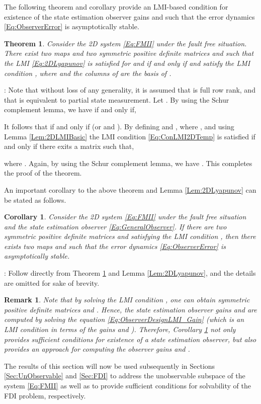 \documentclass[journal,12pt,draftcls,onecolumn]{IEEEtran}
\newcommand{\bs}{\begin{small}}
\newcommand{\es}{\end{small}}
\def\QEDclosed{\hfill\IEEEQEDclosed}
\renewcommand{\qed}{\QEDclosed}
\renewenvironment{proof}[1][\proofname]{\noindent\nobreakspace{\bfseries #1}:\;}{\qed\par}
\newtheorem{theorem}{Theorem}
\newtheorem{corollary}{Corollary}
\newtheorem{remark}{Remark}
\begin{document}
The following theorem and corollary provide an LMI-based condition for existence of the state estimation observer gains  and  such that the error dynamics \eqref{Eq:ObserverError} is asymptotically stable.
\begin{theorem}\label{Thm:ObserverGain2LMIs}
	Consider the 2D system \eqref{Eq:FMII} under the fault free situation.  There exist two maps  and  two symmetric positive definite matrices  and  such that the LMI \eqref{Eq:2DLyapunov} is satisfied for  and  if and only if  and  satisfy the LMI condition , where  and the columns of  are the basis of .
\end{theorem}
\begin{proof}
	Note that  without loss of any generality, it is assumed that  is full row rank, and  that is equivalent to partial state measurement. Let . By using the Schur complement lemma, we have  if and only if,
	
	It follows that
	 if and only if  (or  and ). By defining  and , where , and using Lemma \ref{Lem:2DLMIBasic} the LMI condition \eqref{Eq:ConLMI2DTemp} is satisfied if and only if there exits a matrix  such that,
	\bs
	
	\es
	where . Again, by using the Schur complement lemma, we have
	. This completes the proof of the theorem.
\end{proof}
An important corollary to the above theorem and Lemma \ref{Lem:2DLyapunov} can be stated as follows.
\begin{corollary}\label{Col:ObserverDesignLMI}
	Consider the 2D system \eqref{Eq:FMII} under the fault free situation and the state estimation observer \eqref{Eq:GeneralObserver}. If there are two symmetric positive definite matrices  and  satisfying the LMI condition , then there exists two maps  and  such that the error dynamics \eqref{Eq:ObserverError} is asymptotically stable.
\end{corollary}
\begin{proof}
	Follow directly from Theorem \ref{Thm:ObserverGain2LMIs} and Lemma \ref{Lem:2DLyapunov}, and the details are omitted for sake of brevity.
\end{proof}
\begin{remark}\label{Rem:ObserverLMIConstructive}
	Note that by solving the LMI condition , one can obtain symmetric  positive definite matrices  and . Hence, the state estimation observer gains  and  are computed by solving the equation \eqref{Eq:ObserverDesignLMI_Gain} (which is an LMI condition in terms of the gains  and ). Therefore, Corollary \ref{Col:ObserverDesignLMI} not only provides sufficient conditions for existence of a state estimation observer, but also provides an approach for computing the observer gains  and . \qed
\end{remark}
The results of this section will now be used subsequently in Sections \ref{Sec:UnObservable} and \ref{Sec:FDI} to address the unobservable subspace of the system \eqref{Eq:FMII} as well as to provide sufficient conditions for  solvability of the FDI problem, respectively.
\end{document}

